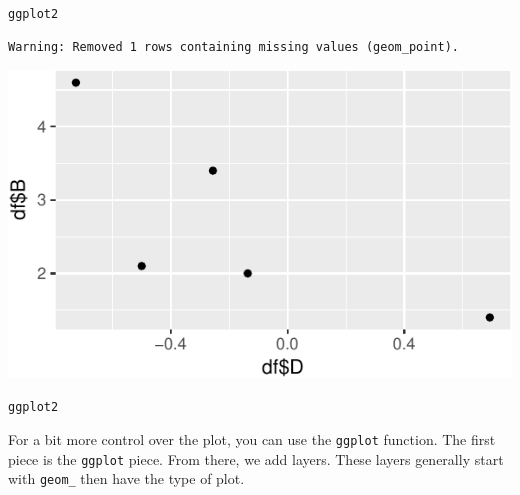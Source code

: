 \begin{frame}[fragile]{\texttt{ggplot2}}

\begin{Shaded}
\begin{Highlighting}[]
\OperatorTok{$}\OperatorTok{$}
\end{Highlighting}
\end{Shaded}

\begin{verbatim}
Warning: Removed 1 rows containing missing values (geom_point).
\end{verbatim}

\includegraphics{03_UnderstandData_files/figure-beamer/unnamed-chunk-10-1.pdf}

\end{frame}

\begin{frame}[fragile]{\texttt{ggplot2}}

For a bit more control over the plot, you can use the \texttt{ggplot}
function. The first piece is the \texttt{ggplot} piece. From there, we
add layers. These layers generally start with \texttt{geom\_} then have
the type of plot.

\end{frame}

